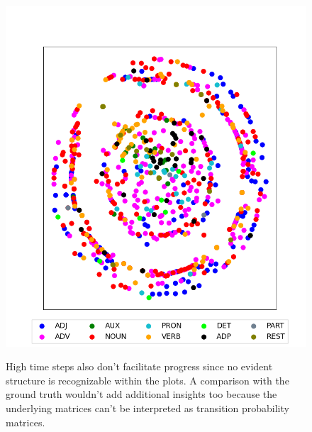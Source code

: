\begin{figure}[H]
{		\includegraphics[width=\twocolpicwidth]{Bilder/chapter4/additional_configurations/hohes_t/OHE_OHE_5000E_100BS_1L_1C_200P_1500T_D/MDS_of_SR,_t=50,_DF=0.5.png}
	}
	\caption{High time steps also don't facilitate progress since no evident structure is recognizable within the plots. A comparison with the ground truth wouldn't add additional insights too because the underlying matrices can't be interpreted as transition probability matrices.}
	\label{fig: high time steps ohe}
\end{figure}
%
\clearpage
